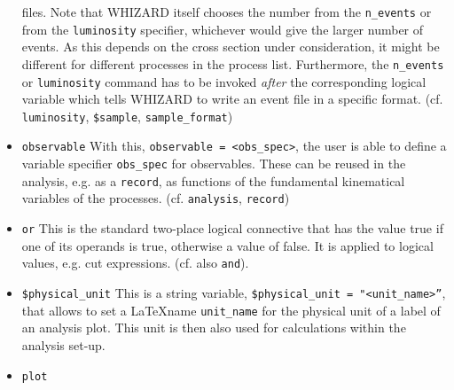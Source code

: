\documentclass[12pt]{book}
\newcommand{\ttt}[1]{\texttt{#1}}
\begin{document}
\begin{itemize}
files. Note that WHIZARD itself chooses the number from the
\ttt{n\_events} or from the \ttt{luminosity} specifier, whichever
would give the larger number of events. As this depends on the cross
section under consideration, it might be different for different
processes in the process list.  
Furthermore, the \ttt{n\_events} or \ttt{luminosity} command has to be
invoked {\em after} the corresponding logical variable which tells
WHIZARD to write an event file in a specific format.
(cf. \ttt{luminosity}, \ttt{\$sample}, \ttt{sample\_format})
\item
\ttt{observable} \newline
With this, \ttt{observable = <obs\_spec>}, the user is able to define
a variable specifier \ttt{obs\_spec} for observables. These can be
reused in the analysis, e.g. as a \ttt{record}, as functions of the
fundamental kinematical variables of the processes. 
(cf. \ttt{analysis}, \ttt{record})
\item
\ttt{or} \newline
This is the standard two-place logical connective that has the value
true if one of its operands is true, otherwise a value of false. It
is applied to logical values, e.g. cut expressions. (cf. also \ttt{and}).
\item
\ttt{\$physical\_unit} \newline
This is a string variable, \ttt{\$physical\_unit = "<unit\_name>''},
that allows to set a \LaTeX name \ttt{unit\_name} for the physical
unit of a label of an analysis plot. This unit is then also used for
calculations within the analysis set-up.  
\item
\ttt{plot} \newline


\end{itemize}
\end{document}
